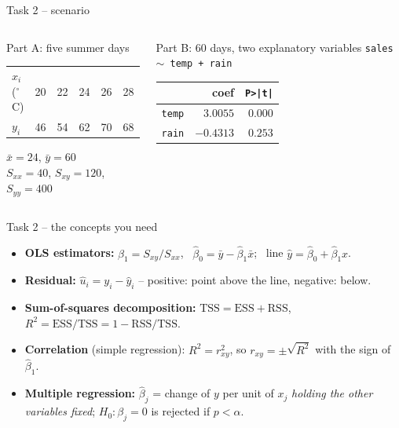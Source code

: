 \documentclass[aspectratio=169,11pt]{beamer}
\renewcommand{\textasciitilde}{\ensuremath{\sim}}
\begin{document}
\begin{frame}{Task 2 -- scenario}
\begin{columns}[T]
    \begin{block}{Part A: five summer days}
      \begin{center}\small
      \begin{tabular}{lccccc}
        \toprule
        $x_i$ ($^{\circ}$C) & 20 & 22 & 24 & 26 & 28\\
        $y_i$ & 46 & 54 & 62 & 70 & 68\\
        \bottomrule
      \end{tabular}
      \end{center}
      \small $\bar x = 24$, $\bar y = 60$\\
      $S_{xx} = 40$, $S_{xy} = 120$, $S_{yy} = 400$
    \end{block}
    \begin{block}{Part B: 60 days, two explanatory variables}
      \small \texttt{sales \textasciitilde{} temp + rain}\\[3pt]
      \begin{tabular}{lrr}
        \toprule
        & coef & \texttt{P>|t|}\\
        \midrule
        \texttt{temp} & $3.0055$ & $0.000$\\
        \texttt{rain} & $-0.4313$ & $0.253$\\
        \bottomrule
      \end{tabular}
    \end{block}
  \end{columns}
\end{frame}

\begin{frame}{Task 2 -- the concepts you need}
  \begin{itemize}\setlength{\itemsep}{3pt}
    \item \textbf{OLS estimators:} $\hat\beta_1 = S_{xy}/S_{xx}$, \ $\hat\beta_0 = \bar y - \hat\beta_1\bar x$; \ line $\hat y = \hat\beta_0 + \hat\beta_1 x$.
    \item \textbf{Residual:} $\hat u_i = y_i - \hat y_i$ -- positive: point above the line, negative: below.
    \item \textbf{Sum-of-squares decomposition:} $\text{TSS} = \text{ESS} + \text{RSS}$, \ $R^2 = \text{ESS}/\text{TSS} = 1 - \text{RSS}/\text{TSS}$.
    \item \textbf{Correlation} (simple regression): $R^2 = r_{xy}^2$, so $r_{xy} = \pm\sqrt{R^2}$ with the sign of $\hat\beta_1$.
    \item \textbf{Multiple regression:} $\hat\beta_j$ = change of $y$ per unit of $x_j$ \emph{holding the other variables fixed}; $H_0\colon \beta_j = 0$ is rejected if $p < \alpha$.
  \end{itemize}
\end{frame}
\end{document}

